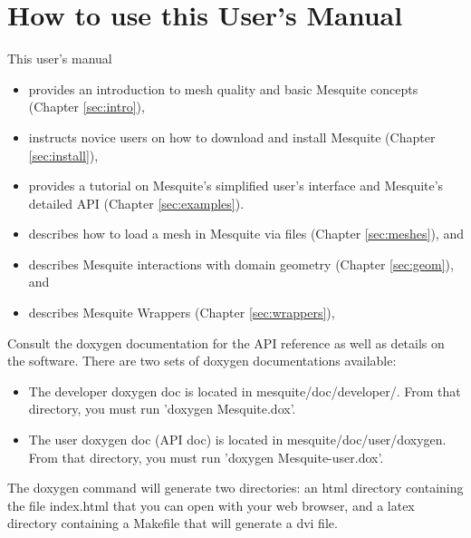 \section{How to use this User's Manual}
This user's manual 
\begin{itemize}
\item provides an introduction to mesh quality and basic Mesquite concepts (Chapter \ref{sec:intro}), 
\item instructs novice users on how to download and install Mesquite (Chapter \ref{sec:install}), 
\item provides a tutorial on Mesquite's simplified user's interface and Mesquite's detailed API (Chapter \ref{sec:examples}).
\item describes how to load a mesh in Mesquite via files (Chapter \ref{sec:meshes}), and 
\item describes Mesquite interactions with domain geometry (Chapter \ref{sec:geom}), and
\item describes Mesquite Wrappers (Chapter \ref{sec:wrappers}),
\end{itemize}

Consult the doxygen documentation for the API reference as well as details on the software. There
are two sets of doxygen documentations available:
\begin{itemize}
\item The developer doxygen doc is located in mesquite/doc/developer/. From that directory, you
      must run 'doxygen Mesquite.dox'.
\item The user doxygen doc (API doc) is located in mesquite/doc/user/doxygen. From that directory, you
      must run 'doxygen Mesquite-user.dox'.
\end{itemize}
The doxygen command will generate two directories: an html directory containing the file
index.html that you can open with your web browser, and a latex directory containing a Makefile that
will generate a dvi file. 

